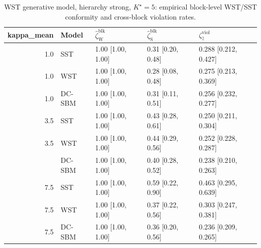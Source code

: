 \begin{table}
\centering
\caption{WST generative model, hierarchy strong, $K^\star=5$: empirical block-level WST/SST conformity and cross-block violation rates.}
\centering
\begin{tabular}[t]{rllll}
\toprule
kappa_mean & Model & $\widehat\zeta_{\mathrm{W}}^{\mathrm{blk}}$ & $\widehat\zeta_{\mathrm{S}}^{\mathrm{blk}}$ & $\zeta^{\mathrm{viol}}_{\hat z}$\\
\midrule
1.0 & SST & 1.00 [1.00, 1.00] & 0.31 [0.20, 0.48] & 0.288 [0.212, 0.427]\\
1.0 & WST & 1.00 [1.00, 1.00] & 0.28 [0.08, 0.48] & 0.275 [0.213, 0.369]\\
1.0 & DC-SBM & 1.00 [1.00, 1.00] & 0.31 [0.11, 0.51] & 0.256 [0.232, 0.277]\\
3.5 & SST & 1.00 [1.00, 1.00] & 0.43 [0.28, 0.61] & 0.250 [0.211, 0.304]\\
3.5 & WST & 1.00 [1.00, 1.00] & 0.44 [0.29, 0.56] & 0.252 [0.228, 0.287]\\
\addlinespace
3.5 & DC-SBM & 1.00 [1.00, 1.00] & 0.40 [0.28, 0.52] & 0.238 [0.210, 0.263]\\
7.5 & SST & 1.00 [1.00, 1.00] & 0.59 [0.22, 0.90] & 0.463 [0.295, 0.639]\\
7.5 & WST & 1.00 [1.00, 1.00] & 0.37 [0.22, 0.56] & 0.303 [0.247, 0.381]\\
7.5 & DC-SBM & 1.00 [1.00, 1.00] & 0.36 [0.20, 0.56] & 0.236 [0.209, 0.265]\\
\bottomrule
\end{tabular}
\end{table}
